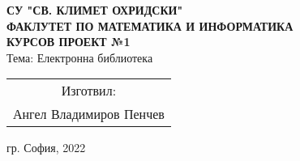 \begin{center}
    \textbf{СУ "СВ. КЛИМЕТ ОХРИДСКИ"\\[0.2cm]}
    \textbf{ФАКЛУТЕТ ПО МАТЕМАТИКА И ИНФОРМАТИКА\\[6cm]}
    \textbf{\LARGE КУРСОВ ПРОЕКТ №1\\[4cm]}
    Тема: Електронна библиотека\\[4cm]

    \begin{minipage}[t]{0.4\textwidth}
        \begin{tabular}{@{}c@{}}
            \large {Изготвил:}      \\
            Ангел Владимиров Пенчев \\
        \end{tabular}
    \end{minipage}

    \vfill

    {\large гр. София, 2022}
\end{center}
